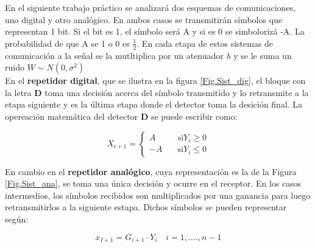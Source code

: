 	\indent En el siguiente trabajo práctico se analizará dos esquemas de comunicaciones, uno digital y otro analógico. En ambos casos se transmitirán símbolos que representan 1 bit. Si el bit es 1, el símbolo será A y si es 0 se simbolorizá -A. La probabilidad de que A se 1 o 0 es $\frac{1}{2}$. En cada etapa de estos sistemas de comunicación a la señal se la mutltiplica por un atenuador \emph{h} y se le suma un ruido $W \sim N(0,\sigma ^2)$\\
	
	\indent En el \textbf{repetidor digital}, que se ilustra en la figura \ref{Fig.Sist_dig}, el bloque con la letra \textbf{D} toma una decisión acerca del símbolo transmitido y lo retransmite a la etapa siguiente y es la última etapa donde el detector toma la desición final. La opereación matemática del detector \textbf{D} se puede escribir como:
	
						\begin{equation}
							X_{i+1}=
									\begin{cases}
											A		& \quad \text{si} Y_i \geq 0 \\
											-A		& \quad \text{si} Y_i \leq 0
									\end{cases}
						\label{Eq.sis.digital}
						\end{equation}

	\indent En cambio en el \textbf{repetidor analógico}, cuya representación es la de la Figura \ref{Fig.Sist_ana}, se toma una única decisión y ocurre en el receptor. En los casos intermedios, los símbolos recibidos son multiplicados por una ganancia para luego retransmitirlos a la siguiente estapa. Dichos símbolos se pueden representar según:
	
						\begin{equation}
							x_{I+1} = G_{i+1} \cdot Y_i \quad i=1,....,n-1
							\label{Eq.sis.analogico}
						\end{equation}
						
